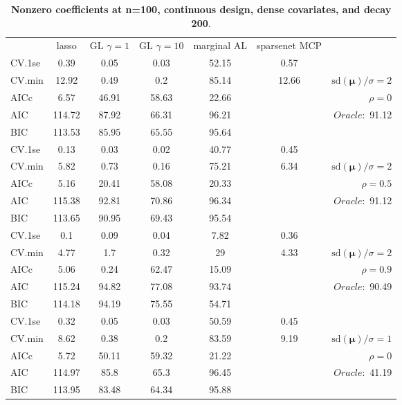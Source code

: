 \begin{table}\vspace{-.5cm}
\caption[l]{ { \bf Nonzero coefficients at n=100, continuous design, 
dense covariates, and  decay  200}.}
\vspace{-.5cm}
\footnotesize{}
\begin{center}
\begin{tabular}{l*{5}{c}|r}
& lasso & GL $\gamma=1$ & GL $\gamma=10$ & marginal AL & sparsenet MCP  & \\
 \cline{1-7}
CV.1se & 0.39 & 0.05 & 0.03 & 52.15 & 0.57 & \\
CV.min & 12.92 & 0.49 & 0.2 & 85.14 & 12.66 &  $\mathrm{sd}(\mathbf{\mu})/\sigma=2$ \\
AICc & 6.57 & 46.91 & 58.63 & 22.66 & & $\rho=0$ \\
AIC & 114.72 & 87.92 & 66.31 & 96.21 & &  \multirow{2}{*}{$Oracle: $ 91.12} \\
BIC & 113.53 & 85.95 & 65.55 & 95.64 & &  \\
 \hline 
CV.1se & 0.13 & 0.03 & 0.02 & 40.77 & 0.45 & \\
CV.min & 5.82 & 0.73 & 0.16 & 75.21 & 6.34 &  $\mathrm{sd}(\mathbf{\mu})/\sigma=2$ \\
AICc & 5.16 & 20.41 & 58.08 & 20.33 & & $\rho=0.5$ \\
AIC & 115.38 & 92.81 & 70.86 & 96.34 & &  \multirow{2}{*}{$Oracle: $ 91.12} \\
BIC & 113.65 & 90.95 & 69.43 & 95.54 & &  \\
 \hline 
CV.1se & 0.1 & 0.09 & 0.04 & 7.82 & 0.36 & \\
CV.min & 4.77 & 1.7 & 0.32 & 29 & 4.33 &  $\mathrm{sd}(\mathbf{\mu})/\sigma=2$ \\
AICc & 5.06 & 0.24 & 62.47 & 15.09 & & $\rho=0.9$ \\
AIC & 115.24 & 94.82 & 77.08 & 93.74 & &  \multirow{2}{*}{$Oracle: $ 90.49} \\
BIC & 114.18 & 94.19 & 75.55 & 54.71 & &  \\
 \hline 
CV.1se & 0.32 & 0.05 & 0.03 & 50.59 & 0.45 & \\
CV.min & 8.62 & 0.38 & 0.2 & 83.59 & 9.19 &  $\mathrm{sd}(\mathbf{\mu})/\sigma=1$ \\
AICc & 5.72 & 50.11 & 59.32 & 21.22 & & $\rho=0$ \\
AIC & 114.97 & 85.8 & 65.3 & 96.45 & &  \multirow{2}{*}{$Oracle: $ 41.19} \\
BIC & 113.95 & 83.48 & 64.34 & 95.88 & &  \\

\end{tabular}
\end{center}
\end{table}
